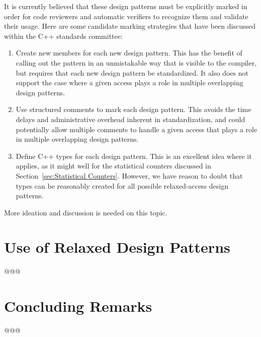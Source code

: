 \documentclass{article}
\begin{document}
It is currently believed that these design patterns must be explicitly marked
in order for code reviewers and automatic verifiers to recognize them
and validate their usage.
Here are some candidate marking strategies that have been discussed
within the C++ standards committee:

\begin{enumerate}
\item	Create new   members for each new
	design pattern.
	This has the benefit of calling out the pattern in an unmistakable
	way that is visible to the compiler, but requires that each
	new design pattern be standardized.
	It also does not support the case where a given access plays a
	role in multiple overlapping design patterns.
\item	Use structured comments to mark each design pattern.
	This avoids the time delays and administrative overhead inherent
	in standardization, and could potentially allow multiple comments
	to handle a given access that plays a role in multiple overlapping
	design patterns.
\item	Define C++  types for each design pattern.
	This is an excellent idea where it applies, as it might well
	for the statistical counters discussed in
	Section~\ref{sec:Statistical Counters}.
	However, we have reason to doubt that  types can
	be reasonably created for all possible relaxed-access design
	patterns.
\end{enumerate}

More ideation and discussion is needed on this topic.

\section{Use of Relaxed Design Patterns}
\label{sec:Use of Relaxed Design Patterns}

@@@

\section{Concluding Remarks}
\label{sec:Concluding Remarks}

@@@




\end{document}
